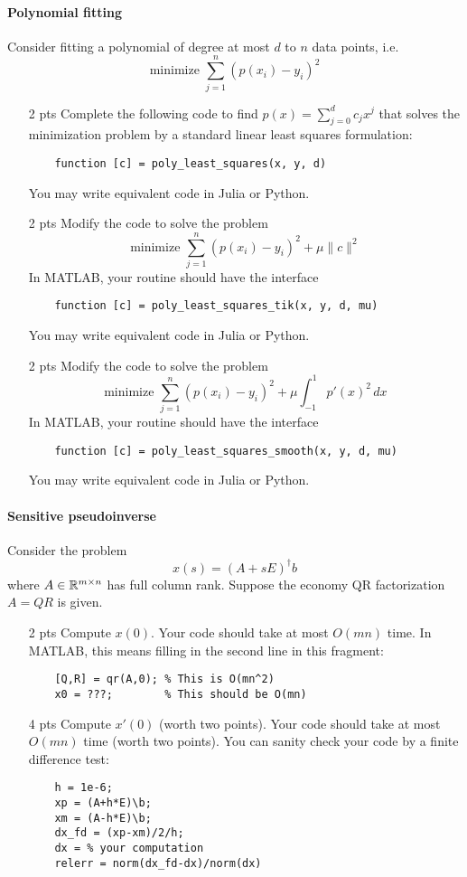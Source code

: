 \documentclass[12pt, leqno]{article} %
\begin{document}
\paragraph*{Polynomial fitting}
Consider fitting a polynomial of degree at most $d$
to $n$ data points, i.e.
\[
  \mbox{minimize } \sum_{j=1}^n (p(x_i)-y_i)^2
\]
\begin{itemize}
\item[2 pts]
  Complete the following code to find $p(x) = \sum_{j=0}^d c_j x^j$
  that solves the minimization problem by a standard
  linear least squares formulation:
  \begin{lstlisting}
    function [c] = poly_least_squares(x, y, d)
  \end{lstlisting}
  You may write equivalent code in Julia or Python.
\item[2 pts]
  Modify the code to solve the problem
  \[
    \mbox{minimize } \sum_{j=1}^n (p(x_i)-y_i)^2 +
    \mu \|c\|^2
  \]
  In MATLAB, your routine should have the interface
  \begin{lstlisting}
    function [c] = poly_least_squares_tik(x, y, d, mu)
  \end{lstlisting}
  You may write equivalent code in Julia or Python.
\item[2 pts]
  Modify the code to solve the problem
  \[
    \mbox{minimize } \sum_{j=1}^n (p(x_i)-y_i)^2 +
    \mu \int_{-1}^1 p'(x)^2 \, dx
    \]
  In MATLAB, your routine should have the interface
  \begin{lstlisting}
    function [c] = poly_least_squares_smooth(x, y, d, mu)
  \end{lstlisting}
  You may write equivalent code in Julia or Python.
\end{itemize}


\paragraph*{Sensitive pseudoinverse}
Consider the problem
\[
  x(s) = (A+sE)^\dagger b
\]
where $A \in \mathbb{R}^{m \times n}$ has full column rank.  Suppose
the economy QR factorization $A = QR$ is given.
\begin{itemize}
\item[2 pts]
  Compute $x(0)$.  Your code should take at most $O(mn)$ time.  In MATLAB,
  this means filling in the second line in this fragment:
  \begin{lstlisting}
    [Q,R] = qr(A,0); % This is O(mn^2)
    x0 = ???;        % This should be O(mn)
  \end{lstlisting}
\item[4 pts]
  Compute $x'(0)$ (worth two points).
  Your code should take at most $O(mn)$ time (worth two points).
  You can sanity check your code by a finite difference test:
  \begin{lstlisting}
    h = 1e-6;
    xp = (A+h*E)\b;
    xm = (A-h*E)\b;
    dx_fd = (xp-xm)/2/h;
    dx = % your computation
    relerr = norm(dx_fd-dx)/norm(dx)
  \end{lstlisting}
\end{itemize}
\end{document}
